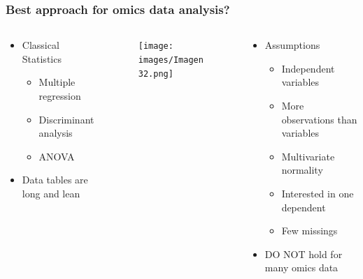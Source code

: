 \documentclass{beamer}
\begin{document}
\begin{frame}
	\frametitle{Best approach for omics data analysis?}
	\begin{columns}%
		
		\begin{column}[t]{0.40\textwidth}%
			\begin{itemize}
				\item Classical Statistics
				\begin{itemize}
					\item Multiple regression
					\item Discriminant analysis 
					\item ANOVA
				\end{itemize}
				\item Data tables are long and lean
			\end{itemize}
		\end{column}
		
		\begin{column}[t]{0.15\textwidth}%
			\begin{figure}[ht]
				\centering
				\texttt{[image: images/Imagen32.png]}
			\end{figure}   			
		\end{column}
		\begin{column}[t]{0.4\textwidth}%
			\begin{itemize}
				\item Assumptions
				\begin{itemize}
					\item Independent variables
					\item More observations than variables
					\item Multivariate normality
					\item Interested in one dependent
					\item Few missings
				\end{itemize}
				\item DO NOT hold for many omics data 
			\end{itemize}
		\end{column}
	\end{columns}
\end{frame} 
\end{document}
